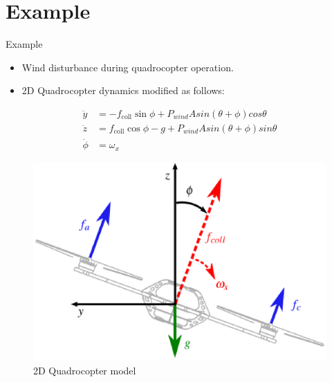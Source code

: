 \documentclass{beamer}
\begin{document}
\section{Example}
\begin{frame}{Example}
\begin{itemize}
\item Wind disturbance during quadrocopter operation. \pause
\item 2D Quadrocopter dynamics modified as follows: \pause
\end{itemize}
\begin{equation}
\begin{aligned}
\ddot{y} &= -f_{\mathrm{coll}} \sin\phi + P_{wind} A sin(\theta + \phi) cos \theta \\
\ddot{z} &=  f_{\mathrm{coll}}\cos\phi - g + P_{wind} A sin(\theta + \phi) sin \theta \\
\dot{\phi} &= \omega_{x}
\end{aligned}
\end{equation}
\begin{figure}
\center
\includegraphics[scale=0.25]{quadrocopter}			
\caption{2D Quadrocopter model}
\end{figure}
\end{frame}
%
\end{document}

